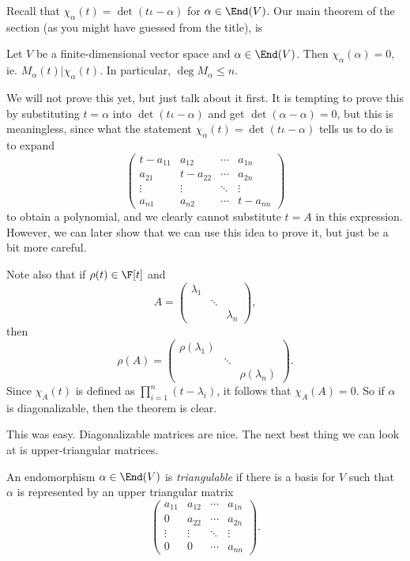 \documentclass[a4paper]{article}
\begin{document}
Recall that $\chi_\alpha(t) = \det (t\iota - \alpha)$ for $\alpha \in \End(V)$. Our main theorem of the section (as you might have guessed from the title), is
\begin{thm}
  Let $V$ be a finite-dimensional vector space and $\alpha \in \End(V)$. Then $\chi_\alpha(\alpha) = 0$, ie. $M_\alpha(t) | \chi_\alpha(t)$. In particular, $\deg M_\alpha \leq n$.
\end{thm}
We will not prove this yet, but just talk about it first. It is tempting to prove this by substituting $t = \alpha$ into $\det(t\iota - \alpha)$ and get $\det (\alpha - \alpha) = 0$, but this is meaningless, since what the statement $\chi_\alpha(t) = \det (t\iota - \alpha)$ tells us to do is to expand
\[
  \begin{pmatrix}
    t - a_{11} & a_{12} & \cdots & a_{1n}\\
    a_{21} & t - a_{22} & \cdots & a_{2n}\\
    \vdots & \vdots & \ddots & \vdots\\
    a_{n1} & a_{n2} & \cdots & t - a_{nn}
  \end{pmatrix}
\]
to obtain a polynomial, and we clearly cannot substitute $t = A$ in this expression. However, we can later show that we can use this idea to prove it, but just be a bit more careful.

Note also that if $\rho(t) \in \F[t]$ and
\[
  A =
  \begin{pmatrix}
    \lambda_1 &\\
    & \ddots\\
    & & \lambda_n
  \end{pmatrix},
\]
then
\[
  \rho(A) =
  \begin{pmatrix}
    \rho(\lambda_1) &\\
    & \ddots\\
    & & \rho(\lambda_n)
  \end{pmatrix}.
\]
Since $\chi_A(t)$ is defined as $\prod_{i = 1}^n (t - \lambda_i)$, it follows that $\chi_A(A) = 0$. So if $\alpha$ is diagonalizable, then the theorem is clear.

This was easy. Diagonalizable matrices are nice. The next best thing we can look at is upper-triangular matrices.
\begin{defi}[Triangulable]
  An endomorphism $\alpha \in \End(V)$ is \emph{triangulable} if there is a basis for $V$ such that $\alpha$ is represented by an upper triangular matrix
  \[
    \begin{pmatrix}
      a_{11} & a_{12} & \cdots & a_{1n}\\
      0 & a_{22} & \cdots & a_{2n}\\
      \vdots & \vdots & \ddots & \vdots\\
      0 & 0 & \cdots & a_{nn}
    \end{pmatrix}.
  \]
\end{defi}
\end{document}

